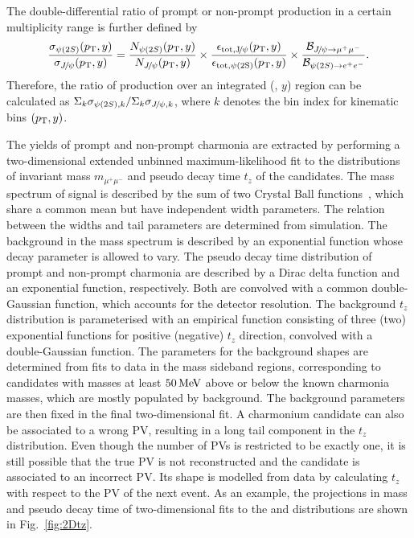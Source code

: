 \documentclass[12pt,a4paper]{article}
\begin{document}
The double-differential ratio of prompt or non-prompt production in a certain multiplicity range is further defined by
\begin{equation}
    \frac{\sigma_{{\psi{(2S)}}}(p_{\mathrm{T}},y)}{\sigma_{{{J\mskip -3mu/\mskip -2mu\psi}}}(p_{\mathrm{T}},y)} =
    \frac{N_{{\psi{(2S)}}}(p_{\mathrm{T}},y)}{N_{{{J\mskip -3mu/\mskip -2mu\psi}}}(p_{\mathrm{T}},y)} \times
    \frac{\epsilon_{\mathrm{tot,{{J\mskip -3mu/\mskip -2mu\psi}}}}(p_{\mathrm{T}},y)} {\epsilon_{\mathrm{tot,{\psi{(2S)}}}}(p_{\mathrm{T}},y)} \times
    \frac{\mathcal{B}_{{{J\mskip -3mu/\mskip -2mu\psi}} \rightarrow \mu^+ \mu^-}}{\mathcal{B}_{{\psi{(2S)}}\rightarrow e^+e^-}}.
    \label{Rsingle}
\end{equation}
Therefore, the ratio of production over an integrated (\pt, $y$) region can be calculated as $\Sigma_{k}\sigma_{{\psi{(2S)}},k} / \Sigma_{k}\sigma_{{{J\mskip -3mu/\mskip -2mu\psi}},k}$, where $k$ denotes the bin index for kinematic bins $(p_{\mathrm{T}},y)$.

The yields of prompt and non-prompt charmonia are extracted by performing a two-dimensional extended unbinned maximum-likelihood fit to the distributions of invariant mass $m_{\mu^+\mu^-}$ and pseudo decay time $t_z$ of the candidates. The mass spectrum of signal is described by the sum of two Crystal Ball functions~\cite{Skwarnicki:1986xj}, which share a common mean but have independent width parameters. The relation between the widths and tail parameters are determined from simulation. The background in the mass spectrum is described by an exponential function whose decay parameter is allowed to vary. The pseudo decay time distribution of prompt and non-prompt charmonia are described by a Dirac delta function and an exponential function, respectively. Both are convolved with a common double-Gaussian function, which accounts for the detector resolution. The background $t_z$ distribution is parameterised with an empirical function consisting of three (two) exponential functions for positive (negative) $t_z$ direction, convolved with a double-Gaussian function. The parameters for the background shapes are determined from fits to data in the mass sideband regions, corresponding to candidates with masses at least $50\text{\,Me\kern -0.1em V}$ above or below the known charmonia masses, which are mostly populated by background. The background parameters are then fixed in the final two-dimensional fit. A charmonium candidate can also be associated to a wrong PV, resulting in a long tail component in the $t_z$ distribution. Even though the number of PVs is restricted to be exactly one, it is still possible that the true PV is not reconstructed and the candidate is associated to an incorrect PV. Its shape is modelled from data by calculating $t_z$ with respect to the PV of the next event. As an example, the projections in mass and pseudo decay time of two-dimensional fits to the \jpsi and \psitwos distributions are shown in Fig.~\ref{fig:2Dtz}.
\end{document}
